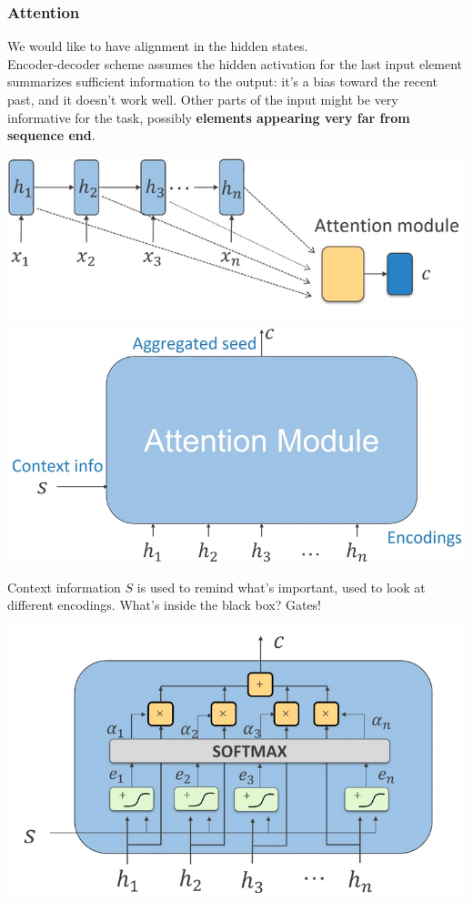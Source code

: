 \documentclass[10pt]{report}
\begin{document}
\subsubsection{Attention}
We would like to have alignment in the hidden states.\\Encoder-decoder scheme assumes the hidden activation for the last input element summarizes sufficient information to the output: it's a bias toward the recent past, and it doesn't work well. Other parts of the input might be very informative for the task, possibly \textbf{elements appearing very far from sequence end}.
\begin{center}
	\includegraphics[scale=0.5]{112.png}\\
	\includegraphics[scale=0.33]{113.png}
\end{center}
Context information $S$ is used to remind what's important, used to look at different encodings. What's inside the black box? Gates! 
\begin{center}
	\includegraphics[scale=0.5]{114.png}
\end{center}
\end{document}
